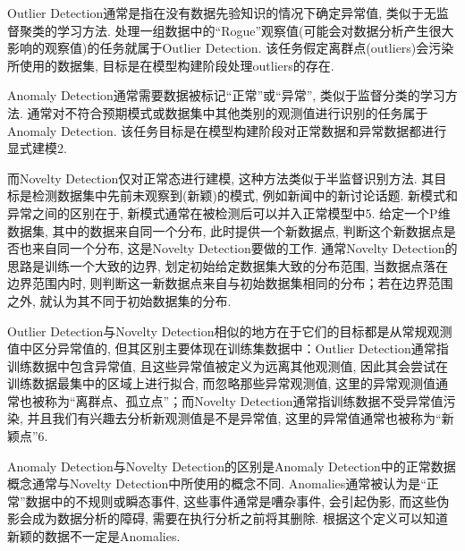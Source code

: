 \documentclass{Style/aas}
\begin{document}
\begin{multicols}{2}
  Outlier Detection通常是指在没有数据先验知识的情况下确定异常值, 类似于无监督聚类的学习方法. 处理一组数据中的“Rogue”观察值(可能会对数据分析产生很大影响的观察值)的任务就属于Outlier Detection. 该任务假定离群点(outliers)会污染所使用的数据集, 目标是在模型构建阶段处理outliers的存在.

  Anomaly Detection通常需要数据被标记“正常”或“异常”, 类似于监督分类的学习方法. 通常对不符合预期模式或数据集中其他类别的观测值进行识别的任务属于Anomaly Detection. 该任务目标是在模型构建阶段对正常数据和异常数据都进行显式建模2.

  而Novelty Detection仅对正常态进行建模, 这种方法类似于半监督识别方法. 其目标是检测数据集中先前未观察到(新颖)的模式, 例如新闻中的新讨论话题. 新模式和异常之间的区别在于, 新模式通常在被检测后可以并入正常模型中5. 给定一个P维数据集, 其中的数据来自同一个分布, 此时提供一个新数据点, 判断这个新数据点是否也来自同一个分布, 这是Novelty Detection要做的工作. 通常Novelty Detection的思路是训练一个大致的边界, 划定初始给定数据集大致的分布范围, 当数据点落在边界范围内时, 则判断这一新数据点来自与初始数据集相同的分布；若在边界范围之外, 就认为其不同于初始数据集的分布.

  Outlier Detection与Novelty Detection相似的地方在于它们的目标都是从常规观测值中区分异常值的, 但其区别主要体现在训练集数据中：Outlier Detection通常指训练数据中包含异常值, 且这些异常值被定义为远离其他观测值, 因此其会尝试在训练数据最集中的区域上进行拟合, 而忽略那些异常观测值, 这里的异常观测值通常也被称为“离群点、孤立点”；而Novelty Detection通常指训练数据不受异常值污染, 并且我们有兴趣去分析新观测值是不是异常值, 这里的异常值通常也被称为“新颖点”6.

  Anomaly Detection与Novelty Detection的区别是Anomaly Detection中的正常数据概念通常与Novelty Detection中所使用的概念不同. Anomalies通常被认为是“正常”数据中的不规则或瞬态事件, 这些事件通常是嘈杂事件, 会引起伪影, 而这些伪影会成为数据分析的障碍, 需要在执行分析之前将其删除. 根据这个定义可以知道新颖的数据不一定是Anomalies.

\end{multicols}
\end{document}
